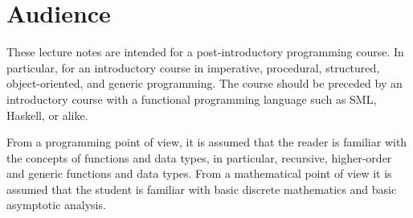 \section{Audience}

These lecture notes are intended for a post-introductory programming course. In
particular, for an introductory course in imperative, procedural, structured,
object-oriented, and generic programming. The course should be preceded by an
introductory course with a functional programming language such as SML,
Haskell, or alike.

From a programming point of view, it is assumed that the reader is familiar
with the concepts of functions and data types, in particular, recursive,
higher-order and generic functions and data types. From a mathematical point of
view it is assumed that the student is familiar with basic discrete mathematics
and basic asymptotic analysis.
